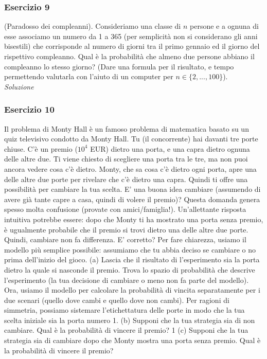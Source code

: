 \subsubsection{Esercizio 9}

(Paradosso dei compleanni). Consideriamo una classe di $n$ persone e a ognuna di esse associamo un numero da 1 a 365 (per semplicità non si considerano gli anni bisestili) che corrisponde al numero di giorni tra il primo gennaio ed il giorno del rispettivo compleanno. Qual è la probabilità che almeno due persone abbiano il compleanno lo stesso giorno? (Dare una formula per il risultato, e tempo permettendo valutarla con l’aiuto di un computer per $n \in \{2, . . . , 100\}$).
\\

\textit{Soluzione} \quad 

\subsubsection{Esercizio 10}
Il problema di Monty Hall è un famoso problema di matematica basato su un quiz televisivo condotto da Monty Hall. Tu (il concorrente) hai davanti tre porte chiuse. C’è un premio ($10^4$ EUR) dietro una porta, e una capra dietro ognuna delle altre due. Ti viene chiesto di scegliere una porta tra le tre, ma non puoi ancora vedere cosa c’è dietro. Monty, che sa cosa c’è dietro ogni porta, apre una delle altre due porte per rivelare che c’è dietro una capra. Quindi ti offre una possibilità per cambiare la tua scelta. E' una buona idea cambiare (assumendo di avere già tante capre a casa, quindi di volere il premio)? Questa domanda genera spesso molta confusione (provate con amici/famiglia!). Un’allettante risposta intuitiva potrebbe essere: dopo che Monty ti ha mostrato una porta senza premio, è ugualmente probabile che il premio si trovi dietro una delle altre due porte. Quindi, cambiare non fa differenza. E' corretto?
Per fare chiarezza, usiamo il modello più semplice possibile: assumiamo che tu abbia deciso se cambiare o no prima dell’inizio del gioco.
(a) Lascia che il risultato di l’esperimento sia la porta dietro la quale si nasconde il premio. Trova lo spazio di probabilità che descrive l’esperimento (la tua decisione di cambiare o meno non fa parte del modello).
Ora, usiamo il modello per calcolare la probabilità di vincita separatamente per i due scenari (quello dove cambi e quello dove non cambi). Per ragioni di simmetria, possiamo sistemare l’etichettatura delle porte in modo che la tua scelta iniziale sia la porta numero 1.
(b) Supponi che la tua strategia sia di non cambiare. Qual è la probabilità di vincere il premio? 1 (c) Supponi che la tua strategia sia di cambiare dopo che Monty mostra una porta senza premio.
Qual è la probabilità di vincere il premio?
\\

